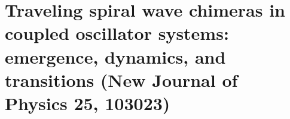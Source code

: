 \chapter{Traveling spiral wave chimeras in coupled
oscillator systems: emergence, dynamics, and
transitions (New Journal of Physics 25, 103023)}


